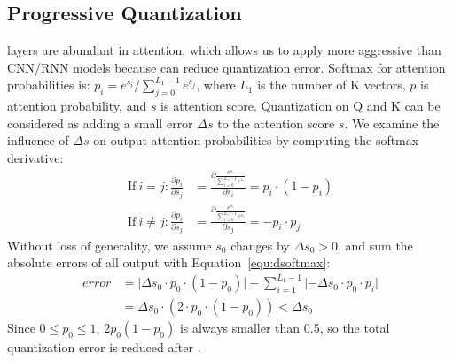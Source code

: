 \subsection{Progressive Quantization}
\label{sec:method:dyna}
\softmax layers are abundant in attention, which allows us to apply more aggressive \lowprec than CNN/RNN models because \softmax can reduce quantization error. Softmax for attention probabilities is:
$p_{i} = e^{s_{i}} / \sum_{j=0}^{L_1-1} e^{s_{j}} $, 
where $L_1$ is the number of K vectors, $p$ is attention probability, and $s$ is attention score. Quantization on Q and K can be considered as adding a small error $\Delta s$ to the attention score $s$. We examine the influence of $\Delta s$ on output attention probabilities by computing the softmax derivative:
\begin{equation}
\label{equ:dsoftmax}
\begin{aligned}
    \mathrm{If \ } i = j: \frac{\partial{p_i}}{\partial{s_j}}
    & = \frac{\partial{\frac{e^{s_{i}}}{\sum_{i=0}^{L_1-1} e^{s_{i}}}}}{\partial{s_i}}
    = p_i \cdot (1-p_i) \\
    \mathrm{If \ } i \neq j: \frac{\partial{p_i}}{\partial{s_j}}
    & = \frac{\partial{\frac{e^{s_{i}}}{\sum_{i=0}^{L_1-1} e^{s_{i}}}}}{\partial{s_j}} 
    = -p_i \cdot p_j
\end{aligned}
\end{equation}
 Without loss of generality, we assume $s_0$ changes by $\Delta s_0 > 0$, and sum the absolute errors of all output with Equation~\ref{equ:dsoftmax}:
\begin{equation}
\label{equ:error}
\begin{aligned}
error 
& = \lvert \Delta s_0 \cdot p_0 \cdot(1-p_0)  \rvert + \sum_{i=1}^{L_1-1} \lvert - \Delta s_0 \cdot p_0 \cdot p_i \rvert \\
& = \Delta s_0 \cdot (2\cdot p_0 \cdot (1-p_0)) < \Delta s_0
\end{aligned}
\end{equation}
Since $0 \le p_0 \le 1$, $2 p_0  (1-p_0)$ is always smaller than 0.5, so the total quantization error is reduced after \softmax.

